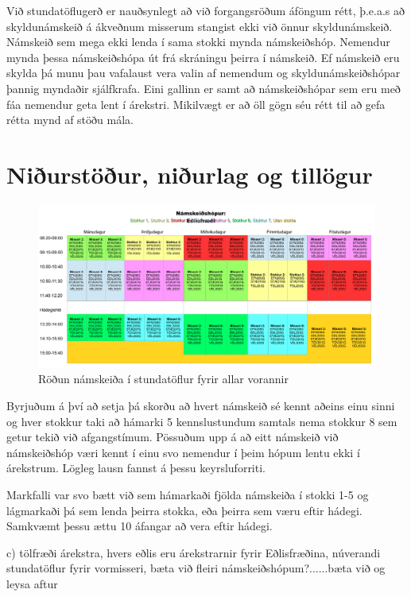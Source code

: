 \documentclass[a4paper,12pt]{article}
\begin{document}
Við stundatöflugerð er nauðsynlegt að við forgangsröðum áföngum rétt, þ.e.a.s að skyldunámskeið á ákveðnum misserum stangist ekki við önnur skyldunámskeið. Námskeið sem mega ekki lenda í sama stokki mynda námskeiðshóp. Nemendur mynda þessa námskeiðshópa út frá skráningu þeirra í námskeið. Ef námskeið eru skylda þá munu þau vafalaust vera valin af nemendum og skyldunámskeiðshópar þannig myndaðir sjálfkrafa. Eini gallinn er samt að námskeiðshópar sem eru með fáa nemendur geta lent í árekstri. Mikilvægt er að öll gögn séu rétt til að gefa rétta mynd af stöðu mála. 

\section{Niðurstöður, niðurlag og tillögur}

\begin{figure}[ht!]
\centering
\includegraphics[width=120mm]{stundatoflur}
\caption{Röðun námskeiða í stundatöflur fyrir allar vorannir}
\label{fig: stundatoflur}
\end{figure}



Byrjuðum á því að setja þá skorðu að hvert námskeið sé kennt aðeins einu sinni og hver stokkur taki að hámarki 5 kennslustundum samtals nema stokkur 8 sem getur tekið við afgangstímum. Pössuðum upp á að eitt námskeið við námskeiðshóp væri kennt í einu svo nemendur í þeim hópum lentu ekki í árekstrum. Lögleg lausn fannst á þessu keyrsluforriti.

Markfalli var svo bætt við sem hámarkaði fjölda námskeiða í stokki 1-5 og lágmarkaði þá sem lenda þeirra stokka, eða þeirra sem væru eftir hádegi. Samkvæmt þessu ættu 10 áfangar að vera eftir hádegi.

c) tölfræði árekstra, hvers eðlis eru árekstrarnir fyrir Eðlisfræðina, núverandi stundatöflur fyrir vormisseri, bæta við fleiri námskeiðshópum?......bæta við og leysa aftur
\end{document}
